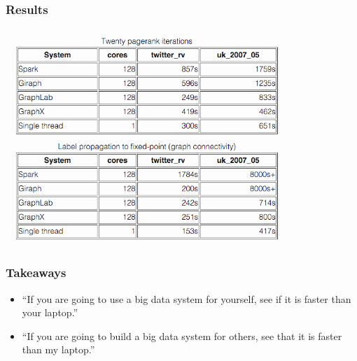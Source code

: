 \begin{frame}
\frametitle{Results}

\begin{center}
	\includegraphics[width=0.80\textwidth]{images/pagerank.png}
\end{center}


\end{frame}



\begin{frame}
\frametitle{Takeaways}

\begin{itemize}
\item    ``If you are going to use a big data system for yourself, see if it is faster than your laptop.''
\item    ``If you are going to build a big data system for others, see that it is faster than my laptop.''
\end{itemize}


\end{frame}




